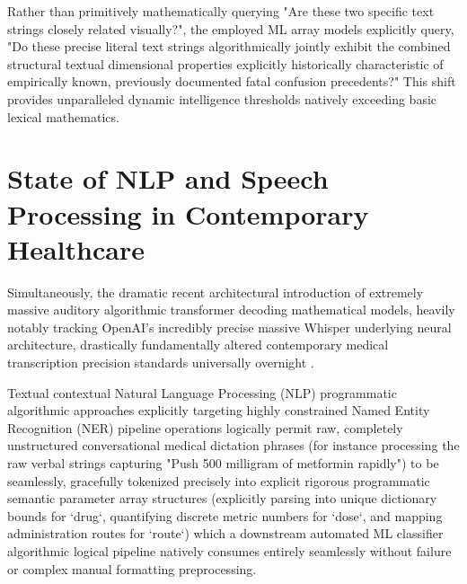 \documentclass[12pt,a4paper]{report}
\begin{document}
Rather than primitively mathematically querying "Are these two specific text strings closely related visually?", the employed ML array models explicitly query, "Do these precise literal text strings algorithmically jointly exhibit the combined structural textual dimensional properties explicitly historically characteristic of empirically known, previously documented fatal confusion precedents?" This shift provides unparalleled dynamic intelligence thresholds natively exceeding basic lexical mathematics.

\section{State of NLP and Speech Processing in Contemporary Healthcare}
Simultaneously, the dramatic recent architectural introduction of extremely massive auditory algorithmic transformer decoding mathematical models, heavily notably tracking OpenAI's incredibly precise massive Whisper underlying neural architecture, drastically fundamentally altered contemporary medical transcription precision standards universally overnight \cite{radford2022}.

Textual contextual Natural Language Processing (NLP) programmatic algorithmic approaches explicitly targeting highly constrained Named Entity Recognition (NER) pipeline operations logically permit raw, completely unstructured conversational medical dictation phrases (for instance processing the raw verbal strings capturing "Push 500 milligram of metformin rapidly") to be seamlessly, gracefully tokenized precisely into explicit rigorous programmatic semantic parameter array structures (explicitly parsing into unique dictionary bounds for `drug`, quantifying discrete metric numbers for `dose`, and mapping administration routes for `route`) which a downstream automated ML classifier algorithmic logical pipeline natively consumes entirely seamlessly without failure or complex manual formatting preprocessing.
\end{document}
